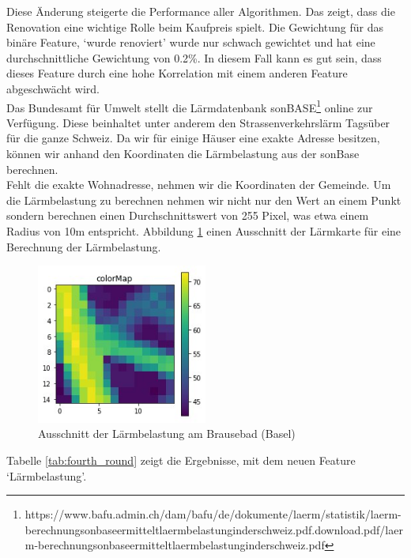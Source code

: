 %
Diese Änderung steigerte die Performance aller Algorithmen. Das zeigt, dass die Renovation eine wichtige Rolle beim Kaufpreis spielt. Die Gewichtung für das binäre Feature, ‘wurde renoviert’ wurde nur schwach gewichtet und hat eine durchschnittliche Gewichtung von 0.2\%. In diesem Fall kann es gut sein, dass dieses Feature durch eine hohe Korrelation mit einem anderen Feature abgeschwächt wird.\\[2ex]
%
Das Bundesamt für Umwelt stellt die Lärmdatenbank sonBASE\footnote{https://www.bafu.admin.ch/dam/bafu/de/dokumente/laerm/statistik/laerm-berechnungsonbaseermitteltlaermbelastunginderschweiz.pdf.download.pdf/laerm-berechnungsonbaseermitteltlaermbelastunginderschweiz.pdf} online zur Verfügung. Diese beinhaltet unter anderem den Strassenverkehrslärm Tagsüber für die ganze Schweiz. Da wir für einige Häuser eine exakte Adresse besitzen, können wir anhand den Koordinaten die Lärmbelastung aus der sonBase berechnen.\\
Fehlt die exakte Wohnadresse, nehmen wir die Koordinaten der Gemeinde. Um die Lärmbelastung zu berechnen nehmen wir nicht nur den Wert an einem Punkt sondern berechnen einen Durchschnittswert von 255 Pixel, was etwa einem Radius von 10m entspricht. Abbildung \ref{fig:noise} einen Ausschnitt der Lärmkarte für eine Berechnung der Lärmbelastung.\\[2ex]
\begin{figure}[ht]
\centering
\includegraphics[width=0.5\textwidth]{images/noise.jpeg}
\caption[Ausschnitt der Lärmbelastung am Brausebad (Basel)]{Ausschnitt der Lärmbelastung am Brausebad (Basel)}
\label{fig:noise}
\end{figure}
\newline
%
Tabelle \ref{tab:fourth_round} zeigt die Ergebnisse, mit dem neuen Feature ‘Lärmbelastung’.\\[2ex]
%
\begin{table}[ht]
\centering
{}
\caption{Ergebnisse mit Einbezug der Lärmbelastung}
\label{tab:fourth_round}
\end{table}
